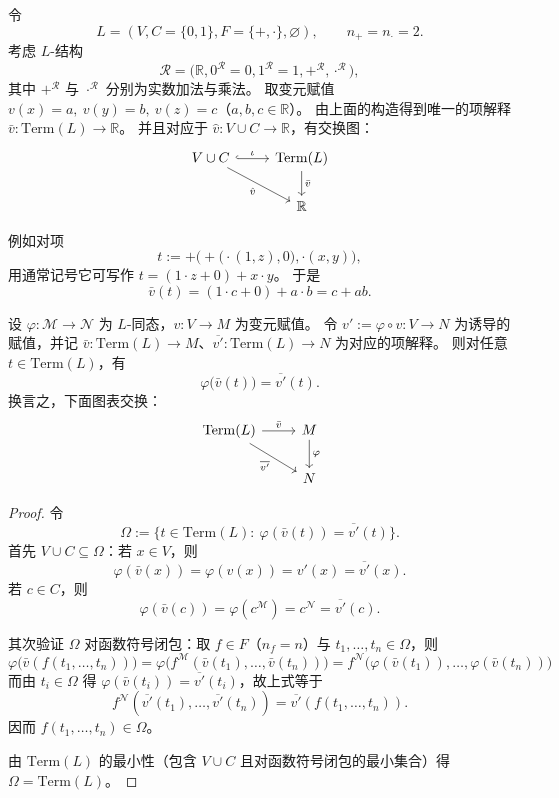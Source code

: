 \documentclass[lang=cn,a4paper,newtx,section]{elegantbook}
\begin{document}
\begin{example}
令
\[
  L=(V,C=\{0,1\},F=\{+ ,\cdot\},\varnothing),\qquad n_{+}=n_{\cdot}=2.
\]
考虑 $L$-结构
\[
  \mathcal R=\bigl(\mathbb R,0^{\mathcal R}=0,1^{\mathcal R}=1,+^{\mathcal R},\cdot^{\mathcal R}\bigr),
\]
其中 $+^{\mathcal R}$ 与 $\cdot^{\mathcal R}$ 分别为实数加法与乘法。
取变元赋值 $v(x)=a,\ v(y)=b,\ v(z)=c$（$a,b,c\in\mathbb R$）。
由上面的构造得到唯一的项解释 $\bar v:\mathrm{Term}(L)\to\mathbb R$。
 并且对应于 $\hat v:V\cup C\to\mathbb R$，有交换图：
 \[
 \begin{tikzcd}
 V\cup C \arrow[r, hook, "\iota"] \arrow[dr, "\hat v"'] & \mathrm{Term}(L) \arrow[d, "\bar v"] \\
 & \mathbb R
 \end{tikzcd}
 \]
 
 例如对项
 \[
   t:=+\bigl(+\bigl(\cdot(1,z),0\bigr),\cdot(x,y)\bigr),
\]
用通常记号它可写作 $t=(1\cdot z+0)+x\cdot y$。
于是
\[
  \bar v(t)=(1\cdot c+0)+a\cdot b=c+a b.
\]
\end{example}
 
 \begin{proposition}[同态与项解释的相容性]
 设 $\varphi:\mathcal M\to\mathcal N$ 为 $L$-同态，$v:V\to M$ 为变元赋值。
 令 $v':=\varphi\circ v:V\to N$ 为诱导的赋值，并记 $\bar v:\mathrm{Term}(L)\to M$、$\overline{v'}:\mathrm{Term}(L)\to N$ 为对应的项解释。
 则对任意 $t\in\mathrm{Term}(L)$，有
 \[
   \varphi\bigl(\bar v(t)\bigr)=\overline{v'}(t).
 \]
 换言之，下面图表交换：
 \[
 \begin{tikzcd}
 \mathrm{Term}(L) \arrow[r, "\bar v"] \arrow[dr, "\overline{v'}"'] & M \arrow[d, "\varphi"] \\
 & N
 \end{tikzcd}
 \]
 \end{proposition}
 
 \begin{proof}
 令
 \[
   \Omega:=\{t\in\mathrm{Term}(L):\ \varphi(\bar v(t))=\overline{v'}(t)\}.
 \]
 首先 $V\cup C\subseteq \Omega$：若 $x\in V$，则
 \[
   \varphi(\bar v(x))=\varphi(v(x))=v'(x)=\overline{v'}(x).
 \]
 若 $c\in C$，则
 \[
   \varphi(\bar v(c))=\varphi(c^{\mathcal M})=c^{\mathcal N}=\overline{v'}(c).
 \]
 
 其次验证 $\Omega$ 对函数符号闭包：取 $f\in F$（$n_f=n$）与 $t_1,\dots,t_n\in\Omega$，则
 \[
   \varphi\bigl(\bar v(f(t_1,\dots,t_n))\bigr)=\varphi\bigl(f^{\mathcal M}(\bar v(t_1),\dots,\bar v(t_n))\bigr)=f^{\mathcal N}\bigl(\varphi(\bar v(t_1)),\dots,\varphi(\bar v(t_n))\bigr)
 \]
 而由 $t_i\in\Omega$ 得 $\varphi(\bar v(t_i))=\overline{v'}(t_i)$，故上式等于
 \[
   f^{\mathcal N}(\overline{v'}(t_1),\dots,\overline{v'}(t_n))=\overline{v'}(f(t_1,\dots,t_n)).
 \]
 因而 $f(t_1,\dots,t_n)\in\Omega$。
 
 由 $\mathrm{Term}(L)$ 的最小性（包含 $V\cup C$ 且对函数符号闭包的最小集合）得 $\Omega=\mathrm{Term}(L)$。
 \end{proof}
 
\end{document}
